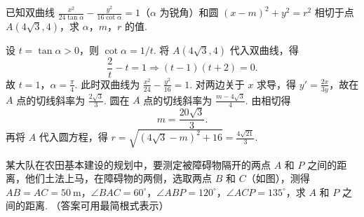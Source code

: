 \begin{problem}
已知双曲线 \( \frac{x^2}{24\tan\alpha}-\frac{y^2}{16\cot\alpha}=1\)（\( \alpha\) 为锐角）和圆 \( \left(x-m\right)^2+y^2=r^2\) 相切于点 \( A\left(4\sqrt3,4\right)\)，求 \( \alpha\)，\(m\)，\(r\) 的值.
\end{problem}

\begin{solution}
设 \(t=\tan\alpha>0\)，则 \(\cot\alpha=1/t\). 将 \(A(4\sqrt3,4)\) 代入双曲线，得
\[
\frac{2}{t}-t=1\Longrightarrow(t-1)(t+2)=0.
\]
故 \(t=1\)，\(\alpha=\frac{\pi}{4}\). 此时双曲线为 \(\frac{x^2}{24}-\frac{y^2}{16}=1\).
对两边关于 \(x\) 求导，得 \(y'=\frac{2x}{3y}\)，故在 \(A\) 点的切线斜率为 \(\frac{2\sqrt3}{3}\).
圆在 \(A\) 点的切线斜率为 \(\frac{m-4\sqrt3}{4}\). 由相切得
\[
m=\frac{20\sqrt3}{3}.
\]
再将 \(A\) 代入圆方程，得 \(r=\sqrt{(4\sqrt3-m)^2+16}=\frac{4\sqrt{21}}3\).
\end{solution}

\begin{problem}
某大队在农田基本建设的规划中，要测定被障碍物隔开的两点 \(A\) 和 \(P\) 之间的距离，他们土法上马，在障碍物的两侧，选取两点 \(B\) 和 \(C\)（如图），测得 \( AB=AC=50\mathrm{~m}\)，\( \angle BAC=60^\circ\)，\( \angle ABP=120^\circ\)，\( \angle ACP=135^\circ\)，求 \(A\) 和 \(P\) 之间的距离. （答案可用最简根式表示）

\end{problem}

